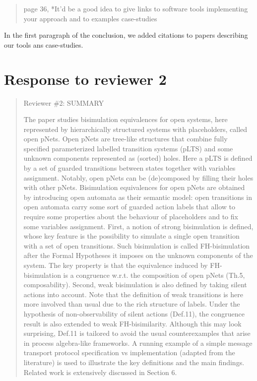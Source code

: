 \documentclass[10pt]{article}
\newenvironment{review}{\bgroup\itshape\begin{quote}}{\end{quote}\egroup}
\begin{document}
\begin{review}
{page 36, *It'd be a good idea to give links to software tools implementing your approach and to examples case-studies}
\end{review}
In the first paragraph of the conclusion, we added citations to papers describing our tools ans case-studies.

\section*{Response to reviewer 2}

\begin{review}
Reviewer \#2: SUMMARY

The paper studies bisimulation equivalences for open systems, here represented by hierarchically structured systems with placeholders, called open pNets.
Open pNets are tree-like structures that combine fully specified parameterized labelled transition systems (pLTS) and some unknown
components represented as (sorted) holes. Here a pLTS is defined by a set of guarded transitions between states together
with variables assignment. Notably, open pNets can be (de)composed by filling their holes with other pNets.
Bisimulation equivalences for open pNets are obtained by introducing open automata as their semantic model:
open transitions in open automata carry some sort of guarded action labels that allow to require some properties about the
behaviour of placeholders and to fix some variables assignment.
First, a notion of strong bisimulation is defined, whose key feature is the possibility to simulate a single open transition
with a set of open transitions. Such bisimulation is called FH-bisimulation after the Formal Hypotheses it imposes
on the unknown components of the system. The key property is that the equivalence induced by FH-bisimulation
is a congruence w.r.t. the composition of open pNets (Th.5, composability).
Second, weak bisimulation is also defined by taking silent actions into account.
Note that the definition of weak transitions is here more involved than usual due to the rich structure of labels.
Under the hypothesis of non-observability of silent actions (Def.11), the congruence result is also extended
to weak FH-bisimilarity. Although this may look surprising, Def.11 is tailored to avoid the usual counterexamples
that arise in process algebra-like frameworks.
A running example of a simple message transport protocol specification vs implementation (adapted from the literature) is used
to illustrate the key definitions and the main findings.
Related work is extensively discussed in Section 6.


\end{review}
\end{document}
